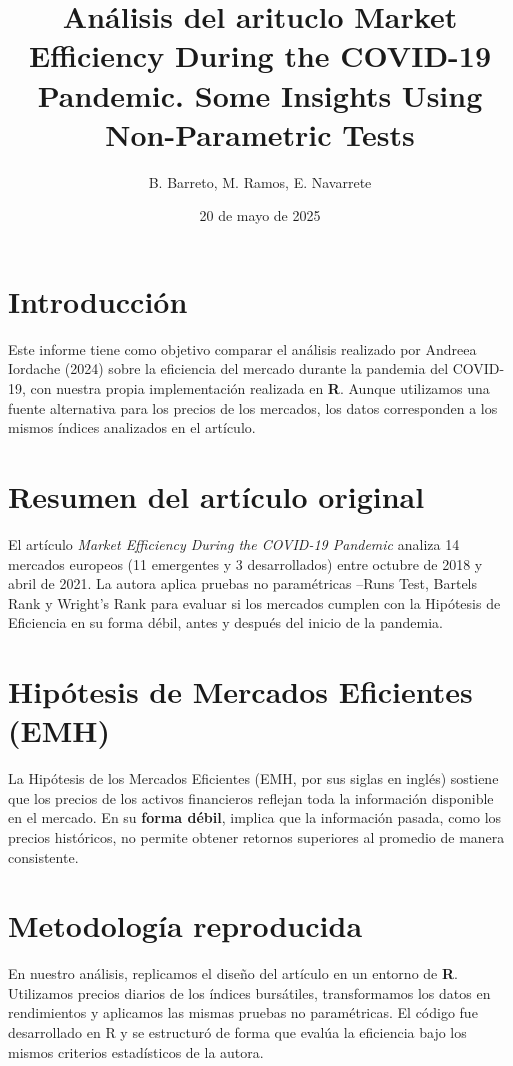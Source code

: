 \documentclass[12pt]{article}
\title{Análisis del arituclo Market Efficiency During the COVID-19 Pandemic. Some
Insights Using Non-Parametric Tests }
\author{B. Barreto, M. Ramos, E. Navarrete}
\date{20 de mayo de 2025}
\begin{document}
\maketitle

\section{Introducción}
Este informe tiene como objetivo comparar el análisis realizado por Andreea Iordache (2024) sobre la eficiencia del mercado durante la pandemia del COVID-19, con nuestra propia implementación realizada en \textbf{R}. Aunque utilizamos una fuente alternativa para los precios de los mercados, los datos corresponden a los mismos índices analizados en el artículo.

\section{Resumen del artículo original}
El artículo \textit{Market Efficiency During the COVID-19 Pandemic} analiza 14 mercados europeos (11 emergentes y 3 desarrollados) entre octubre de 2018 y abril de 2021. La autora aplica pruebas no paramétricas --Runs Test, Bartels Rank y Wright’s Rank para evaluar si los mercados cumplen con la Hipótesis de Eficiencia en su forma débil, antes y después del inicio de la pandemia.

\section{Hipótesis de Mercados Eficientes (EMH)}

La Hipótesis de los Mercados Eficientes (EMH, por sus siglas en inglés) sostiene que los precios de los activos financieros reflejan toda la información disponible en el mercado. En su \textbf{forma débil}, implica que la información pasada, como los precios históricos, no permite obtener retornos superiores al promedio de manera consistente.


\section{Metodología reproducida}
En nuestro análisis, replicamos el diseño del artículo en un entorno de \textbf{R}. Utilizamos precios diarios de los índices bursátiles, transformamos los datos en rendimientos y aplicamos las mismas pruebas no paramétricas. El código fue desarrollado en R y se estructuró de forma que evalúa la eficiencia bajo los mismos criterios estadísticos de la autora.
\end{document}
